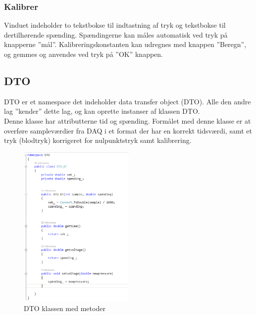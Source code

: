 \subsubsection{Kalibrer}
Vinduet indeholder to tekstbokse til indtastning af tryk og tekstbokse til dertilhørende spænding. Spændingerne kan måles automatisk ved tryk på knapperne ”mål”.
Kalibreringskonstanten kan udregnes med knappen ”Beregn”, og gemmes og anvendes ved tryk på ”OK” knappen.

\subsection{DTO}
DTO er et namespace det indeholder data transfer object (DTO). Alle den andre lag ”kender” dette lag, og kan oprette instanser af klassen DTO.\\
Denne klasse har attributterne tid og spænding. Formålet med denne klasse er at overføre sampleværdier fra DAQ i et format der har en korrekt tidsværdi, samt et tryk (blodtryk) korrigeret for nulpunktstryk samt kalibrering.
\begin{figure}[H]
	\centering
	\includegraphics[width=0.5\textwidth]{Figurer/DTO_kode}
	\caption{DTO klassen med metoder}
\end{figure}

